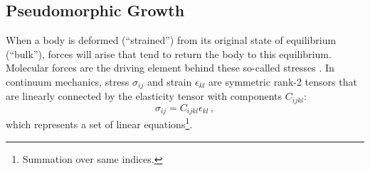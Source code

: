 \subsection{Pseudomorphic Growth}
\label{sec:Theory_PseudomorphicGrowth}

When a body is deformed (\enquote{strained}) from its original state of equilibrium (\enquote{bulk}), forces will arise that tend to return the body to this equilibrium.
Molecular forces are the driving element behind these so-called stresses
    \cite{landau1970}.
In continuum mechanics, stress $\sigma_{ij}$ and strain $\epsilon_{kl}$ are symmetric rank-2 tensors that are linearly connected by the elasticity tensor with components $C_{ijkl}$:
\begin{equation}\label{equ:stress-strain}
    \sigma_{ij}=C_{ijkl}\epsilon_{kl}\,,
\end{equation}
which represents a set of linear equations\footnote{
    Summation over same indices.%
}.

